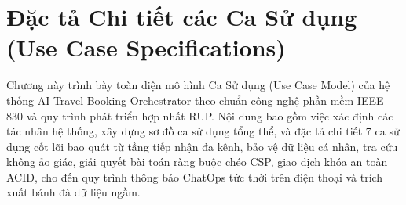 \chapter{Đặc tả Chi tiết các Ca Sử dụng (Use Case Specifications)}
\label{chap:dac_ta_use_case}

Chương này trình bày toàn diện mô hình Ca Sử dụng (Use Case Model) của hệ thống AI Travel Booking Orchestrator theo chuẩn công nghệ phần mềm IEEE 830 và quy trình phát triển hợp nhất RUP. Nội dung bao gồm việc xác định các tác nhân hệ thống, xây dựng sơ đồ ca sử dụng tổng thể, và đặc tả chi tiết 7 ca sử dụng cốt lõi bao quát từ tầng tiếp nhận đa kênh, bảo vệ dữ liệu cá nhân, tra cứu không ảo giác, giải quyết bài toán ràng buộc chéo CSP, giao dịch khóa an toàn ACID, cho đến quy trình thông báo ChatOps tức thời trên điện thoại và trích xuất bánh đà dữ liệu ngầm.





